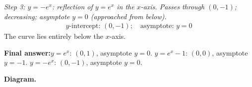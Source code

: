 \documentclass[11pt]{article}
\begin{document}
\textit{Step 3: \( y = -e^x \): reflection of \( y = e^x \) in the \( x \)-axis. Passes through \( (0,-1) \); decreasing; asymptote \( y = 0 \) (approached from below).}
\[\begin{gathered}
y\text{-intercept: } (0,-1); \quad \text{asymptote: } y = 0
\end{gathered}\]
The curve lies entirely below the \( x \)-axis.

\begin{answerbox}
\textbf{Final answer:}\quad \(\displaystyle  y=e^x \): \(\displaystyle  (0,1) \), asymptote \(\displaystyle  y=0 \). \(\displaystyle  y=e^x-1 \): \(\displaystyle  (0,0) \), asymptote \(\displaystyle  y=-1 \). \(\displaystyle  y=-e^x \): \(\displaystyle  (0,-1) \), asymptote \(\displaystyle  y=0 \).
\end{answerbox}
\textbf{Diagram.}
\end{document}
